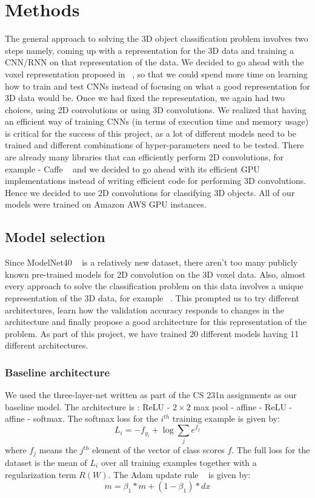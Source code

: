 \documentclass[10pt,twocolumn,letterpaper]{article}
\begin{document}
\section{Methods}
\label{sec:methods_section}
The general approach to solving the 3D object classification problem involves two steps namely, coming up with a representation for the 3D data and training a CNN/RNN on that representation of the data. We decided to go ahead with the voxel representation proposed in ~\cite{Authors14}, so that we could spend more time on learning how to train and test CNNs instead of focusing on what a good representation for 3D data would be. Once we had fixed the representation, we again had two choices, using 2D convolutions or using 3D convolutions. We realized that having an efficient way of training CNNs (in terms of execution time and memory usage) is critical for the success of this project, as a lot of different models need to be trained and different combinations of hyper-parameters need to be tested. There are already many libraries that can efficiently perform 2D convolutions, for example - Caffe ~\cite{jia2014caffe} and we decided to go ahead with its efficient GPU implementations instead of writing efficient code for performing 3D convolutions. Hence we decided to use 2D convolutions for classifying 3D objects. All of our models were trained on Amazon AWS GPU instances.
\subsection{Model selection}
Since ModelNet40 ~\cite{Authors14} is a relatively new dataset, there aren't too many publicly known pre-trained models for 2D convolution on the 3D voxel data. Also, almost every approach to solve the classification problem on this data involves a unique representation of the 3D data, for example ~\cite{deeppano}. This prompted us to try different architectures, learn how the validation accuracy responds to changes in the architecture and finally propose a good architecture for this representation of the problem. As part of this project, we have trained 20 different models having 11 different architectures. 
\subsubsection{Baseline architecture}
We used the three-layer-net written as part of the CS 231n assignments as our baseline model. The architecture is : ReLU - $2 \times 2$ max pool - affine - ReLU - affine - softmax. The softmax loss for the $i^{th}$ training example is given by:
\begin{equation}
L_i = -f_{y_{i}} + \log \sum\limits_{j} e^{f_j} 
\end{equation}
where ${f_j}$ means the $j^{th}$ element of the vector of class scores $f$. The full loss for the dataset is the mean of $L_i$
 over all training examples together with a regularization term $R(W)$. The Adam update rule ~\cite{kingma2014adam} is given by:
\begin{equation}
m=\beta_1*m + (1-\beta_1) * dx
\end{equation}
\end{document}

